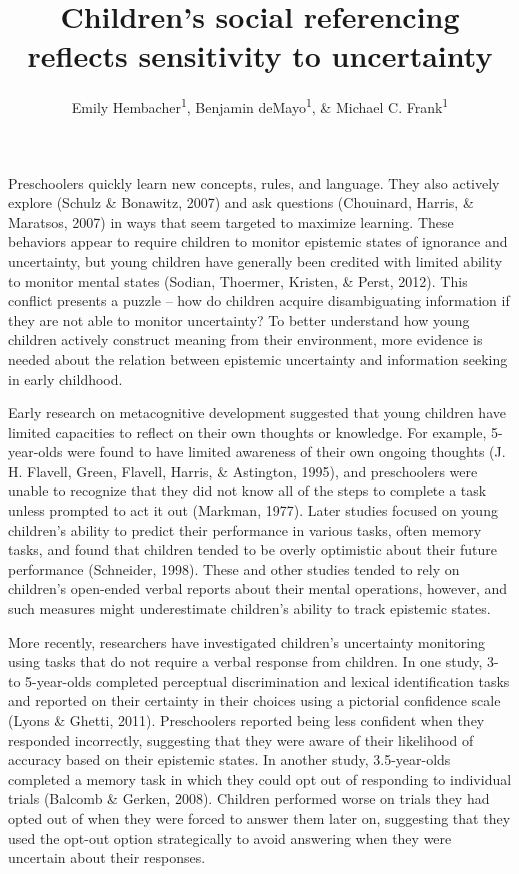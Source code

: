 \documentclass[english,man]{apa6}
\title{Children's social referencing reflects sensitivity to uncertainty}
\author{Emily Hembacher\textsuperscript{1}, Benjamin deMayo\textsuperscript{1}, \& Michael C. Frank\textsuperscript{1}}
\affiliation{
    \vspace{0.5cm}
          \textsuperscript{1} Stanford University  }
\theoremstyle{definition}
\theoremstyle{definition}
\theoremstyle{definition}
\theoremstyle{remark}
\begin{document}
\maketitle

\setcounter{secnumdepth}{0}



Preschoolers quickly learn new concepts, rules, and language. They also
actively explore (Schulz \& Bonawitz, 2007) and ask questions
(Chouinard, Harris, \& Maratsos, 2007) in ways that seem targeted to
maximize learning. These behaviors appear to require children to monitor
epistemic states of ignorance and uncertainty, but young children have
generally been credited with limited ability to monitor mental states
(Sodian, Thoermer, Kristen, \& Perst, 2012). This conflict presents a
puzzle -- how do children acquire disambiguating information if they are
not able to monitor uncertainty? To better understand how young children
actively construct meaning from their environment, more evidence is
needed about the relation between epistemic uncertainty and information
seeking in early childhood.

Early research on metacognitive development suggested that young
children have limited capacities to reflect on their own thoughts or
knowledge. For example, 5-year-olds were found to have limited awareness
of their own ongoing thoughts (J. H. Flavell, Green, Flavell, Harris, \&
Astington, 1995), and preschoolers were unable to recognize that they
did not know all of the steps to complete a task unless prompted to act
it out (Markman, 1977). Later studies focused on young children's
ability to predict their performance in various tasks, often memory
tasks, and found that children tended to be overly optimistic about
their future performance (Schneider, 1998). These and other studies
tended to rely on children's open-ended verbal reports about their
mental operations, however, and such measures might underestimate
children's ability to track epistemic states.

More recently, researchers have investigated children's uncertainty
monitoring using tasks that do not require a verbal response from
children. In one study, 3- to 5-year-olds completed perceptual
discrimination and lexical identification tasks and reported on their
certainty in their choices using a pictorial confidence scale (Lyons \&
Ghetti, 2011). Preschoolers reported being less confident when they
responded incorrectly, suggesting that they were aware of their
likelihood of accuracy based on their epistemic states. In another
study, 3.5-year-olds completed a memory task in which they could opt out
of responding to individual trials (Balcomb \& Gerken, 2008). Children
performed worse on trials they had opted out of when they were forced to
answer them later on, suggesting that they used the opt-out option
strategically to avoid answering when they were uncertain about their
responses.
\end{document}
